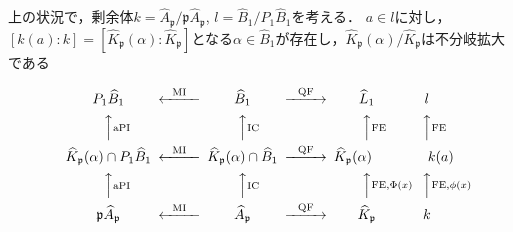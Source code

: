 \begin{screen}
  \begin{thm}\label{CDVR_unr}
    上の状況で，剰余体$k=\widehat{A}_\mathfrak{p}/\mathfrak{p}\widehat{A}_\mathfrak{p}$, $l=\widehat{B}_1/P_1\widehat{B}_1$を考える．
    $a\in l$に対し，$[k(a):k]=[\widehat{K}_\mathfrak{p}(\alpha):\widehat{K}_\mathfrak{p}]$となる$\alpha\in\widehat{B}_1$が存在し，$\widehat{K}_\mathfrak{p}(\alpha)/\widehat{K}_\mathfrak{p}$は不分岐拡大である
  \end{thm}
\end{screen}
\[
\begin{CD}
  P_1\widehat{B}_1 @<\text{MI}<< \widehat{B}_1 @>\text{QF}>> \widehat{L}_1 @. l \\
  @AA\text{aPI}A @AA\text{IC}A @AA\text{FE}A @AA\text{FE}A \\
  \widehat{K}_\mathfrak{p}(\alpha)\cap P_1\widehat{B}_1 @<\text{MI}<< \widehat{K}_\mathfrak{p}(\alpha)\cap\widehat{B}_1 @>\text{QF}>> \widehat{K}_\mathfrak{p}(\alpha)\qquad @. \qquad k(a) \\
  @AA\text{aPI}A @AA\text{IC}A @AA{\text{FE}, \Phi(x)}A @AA{\text{FE}, \phi(x)}A \\
  \mathfrak{p}\widehat{A}_\mathfrak{p} @<\text{MI}<< \widehat{A}_\mathfrak{p} @>\text{QF}>> \widehat{K}_\mathfrak{p} @. k
\end{CD}
\]
